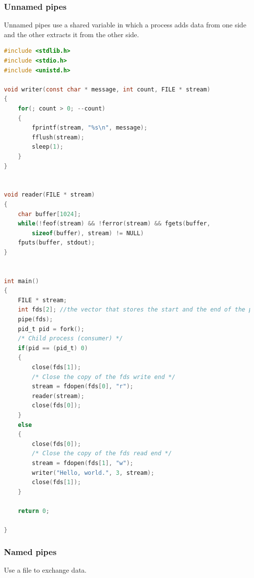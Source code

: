 \subsubsection{Unnamed pipes}
 Unnamed pipes use a shared variable in which a process adds data from one side and the other extracts it from the other side.

\begin{lstlisting}[language=C]
#include <stdlib.h>
#include <stdio.h>
#include <unistd.h>

void writer(const char * message, int count, FILE * stream)
{
	for(; count > 0; --count)
	{
		fprintf(stream, "%s\n", message);
		fflush(stream);
		sleep(1);
	}
}


void reader(FILE * stream)
{
	char buffer[1024];
	while(!feof(stream) && !ferror(stream) && fgets(buffer,
		sizeof(buffer), stream) != NULL)
	fputs(buffer, stdout);
}


int main()
{
	FILE * stream;
	int fds[2]; //the vector that stores the start and the end of the pipe
	pipe(fds);
	pid_t pid = fork();
	/* Child process (consumer) */
	if(pid == (pid_t) 0)
	{
		close(fds[1]);
		/* Close the copy of the fds write end */
		stream = fdopen(fds[0], "r");
		reader(stream);
		close(fds[0]);
	}
	else
	{
		close(fds[0]);
		/* Close the copy of the fds read end */
		stream = fdopen(fds[1], "w");
		writer("Hello, world.", 3, stream);
		close(fds[1]);
	}
	
	return 0;

}
\end{lstlisting}

\subsubsection{Named pipes}
Use a file to exchange data.




